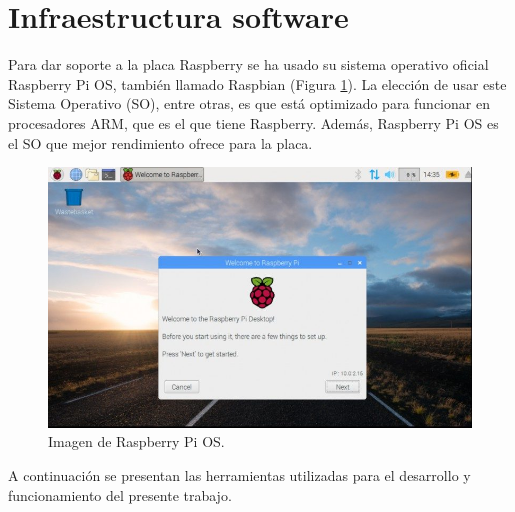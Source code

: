 \section{Infraestructura software}
Para dar soporte a la placa Raspberry se ha usado su sistema operativo oficial Raspberry Pi OS, también llamado Raspbian (Figura \ref{fig:raspbian}). La elección de usar este Sistema Operativo (SO), entre otras, es que está optimizado para funcionar en procesadores ARM, que es el que tiene Raspberry. Además, Raspberry Pi OS es el SO que mejor rendimiento ofrece para la placa.\\
\begin{figure} [h!]
  \begin{center}
    \includegraphics[width=14cm]{figs/raspbian}
  \end{center}
  \caption{Imagen de Raspberry Pi OS.}
  \label{fig:raspbian}
\end{figure}

A continuación se presentan las herramientas utilizadas para el desarrollo y funcionamiento del presente trabajo.

